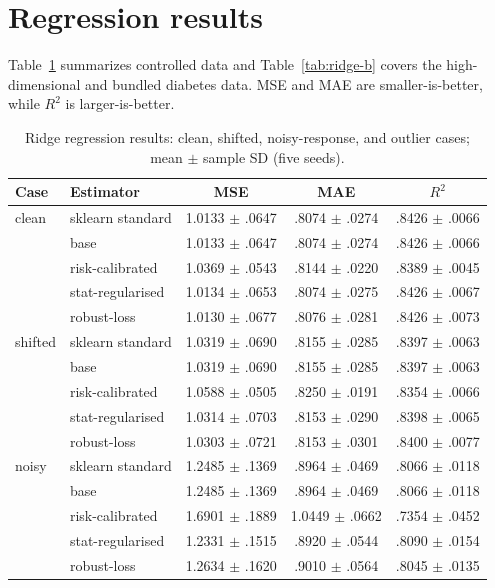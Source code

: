 \documentclass[conference]{IEEEtran}
\begin{document}
\section{Regression results}
Table~\ref{tab:ridge-a} summarizes controlled data and Table~\ref{tab:ridge-b} covers the high-dimensional and bundled diabetes data. MSE and MAE are smaller-is-better, while \(R^2\) is larger-is-better.
\begin{table}[t]
\centering\scriptsize
\setlength{\tabcolsep}{2.6pt}
\caption{Ridge regression results: clean, shifted, noisy-response, and outlier cases; mean $\pm$ sample SD (five seeds).}
\label{tab:ridge-a}
\begin{tabular}{llccc}
\toprule
Case & Estimator & MSE & MAE & $R^2$ \\
\midrule
clean & sklearn standard & 1.0133 $\pm$ .0647 & .8074 $\pm$ .0274 & .8426 $\pm$ .0066 \\
 & base & 1.0133 $\pm$ .0647 & .8074 $\pm$ .0274 & .8426 $\pm$ .0066 \\
 & risk-calibrated & 1.0369 $\pm$ .0543 & .8144 $\pm$ .0220 & .8389 $\pm$ .0045 \\
 & stat-regularised & 1.0134 $\pm$ .0653 & .8074 $\pm$ .0275 & .8426 $\pm$ .0067 \\
 & robust-loss & 1.0130 $\pm$ .0677 & .8076 $\pm$ .0281 & .8426 $\pm$ .0073 \\
\midrule
shifted & sklearn standard & 1.0319 $\pm$ .0690 & .8155 $\pm$ .0285 & .8397 $\pm$ .0063 \\
 & base & 1.0319 $\pm$ .0690 & .8155 $\pm$ .0285 & .8397 $\pm$ .0063 \\
 & risk-calibrated & 1.0588 $\pm$ .0505 & .8250 $\pm$ .0191 & .8354 $\pm$ .0066 \\
 & stat-regularised & 1.0314 $\pm$ .0703 & .8153 $\pm$ .0290 & .8398 $\pm$ .0065 \\
 & robust-loss & 1.0303 $\pm$ .0721 & .8153 $\pm$ .0301 & .8400 $\pm$ .0077 \\
\midrule
noisy & sklearn standard & 1.2485 $\pm$ .1369 & .8964 $\pm$ .0469 & .8066 $\pm$ .0118 \\
 & base & 1.2485 $\pm$ .1369 & .8964 $\pm$ .0469 & .8066 $\pm$ .0118 \\
 & risk-calibrated & 1.6901 $\pm$ .1889 & 1.0449 $\pm$ .0662 & .7354 $\pm$ .0452 \\
 & stat-regularised & 1.2331 $\pm$ .1515 & .8920 $\pm$ .0544 & .8090 $\pm$ .0154 \\
 & robust-loss & 1.2634 $\pm$ .1620 & .9010 $\pm$ .0564 & .8045 $\pm$ .0135 \\

\end{tabular}
\end{table}
\end{document}
